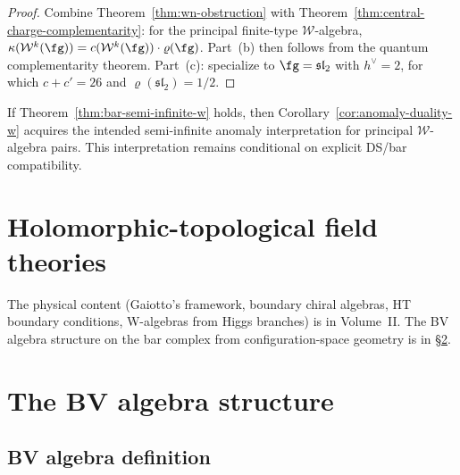 \begin{proof}
Combine Theorem~\ref{thm:wn-obstruction} with
Theorem~\ref{thm:central-charge-complementarity}: for the principal
finite-type $\mathcal{W}$-algebra,
$\kappa(\mathcal{W}^k(\fg)) = c(\mathcal{W}^k(\fg))\cdot\varrho(\fg)$.
Part~(b) then follows from the quantum complementarity theorem.
Part~(c): specialize to $\fg = \mathfrak{sl}_2$ with $h^\vee = 2$,
for which $c + c' = 26$ and $\varrho(\mathfrak{sl}_2)=1/2$.
\end{proof}

\begin{remark}
\label{rem:w-semi-infinite-conditional}
If Theorem~\ref{thm:bar-semi-infinite-w} holds, then
Corollary~\ref{cor:anomaly-duality-w} acquires the intended
semi-infinite anomaly interpretation for principal
$\mathcal{W}$-algebra pairs. This interpretation remains conditional
on explicit DS/bar compatibility.
\end{remark}

\section{Holomorphic-topological field theories}

The physical content (Gaiotto's framework, boundary chiral
algebras, HT boundary conditions, W-algebras from Higgs branches)
is in Volume~II\@. The BV algebra structure on the bar complex
from configuration-space geometry is in
\S\ref{sec:complete-bv-structure}.

\label{rem:ht-from-n4-sym}%
\label{rem:boundary-chiral-algebra-bv}%
\label{rem:bar-cobar-ht-boundary}%
\label{rem:w-algebra-bar-cobar}%


\section{The BV algebra structure}
\label{sec:complete-bv-structure}

\subsection{BV algebra definition}

